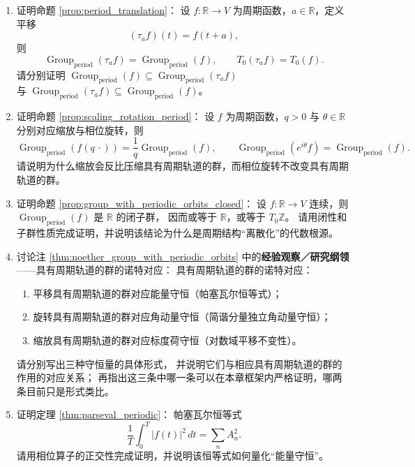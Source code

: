 \begin{enumerate}[leftmargin=3em, label=\textbf{题 \arabic*}]
    \item 证明命题 \ref{prop:period_translation}：
    设 $f:\mathbb{R}\to V$ 为周期函数，$a\in\mathbb{R}$，定义平移
    \[
    (\tau_af)(t)=f(t+a),
    \]
    则
    \[
    \operatorname{Group}_{\mathrm{period}}(\tau_af)=\operatorname{Group}_{\mathrm{period}}(f),\qquad
    T_0(\tau_af)=T_0(f).
    \]
    请分别证明 $\operatorname{Group}_{\mathrm{period}}(f)\subseteq\operatorname{Group}_{\mathrm{period}}(\tau_af)$\\
    与 $\operatorname{Group}_{\mathrm{period}}(\tau_af)\subseteq\operatorname{Group}_{\mathrm{period}}(f)$。

    \item 证明命题 \ref{prop:scaling_rotation_period}：
    设 $f$ 为周期函数，$q>0$ 与 $\theta\in\mathbb{R}$ 分别对应缩放与相位旋转，则
    \[
    \operatorname{Group}_{\mathrm{period}}(f(q\,\cdot))=\frac{1}{q}\operatorname{Group}_{\mathrm{period}}(f),\qquad
    \operatorname{Group}_{\mathrm{period}}(e^{i\theta}f)=\operatorname{Group}_{\mathrm{period}}(f).
    \]
    请说明为什么缩放会反比压缩具有周期轨道的群，而相位旋转不改变具有周期轨道的群。

    \item 证明命题 \ref{prop:group_with_periodic_orbits_closed}：
    设 $f:\mathbb{R}\to V$ 连续，则 $\operatorname{Group}_{\mathrm{period}}(f)$ 是 $\mathbb{R}$ 的闭子群，
    因而或等于 $\mathbb{R}$，或等于 $T_0\mathbb{Z}$。
    请用闭性和子群性质完成证明，并说明该结论为什么是周期结构“离散化”的代数根源。

    \item 讨论注 \ref{thm:noether_group_with_periodic_orbits} 中的\textbf{经验观察／研究纲领}——具有周期轨道的群的诺特对应：
    具有周期轨道的群的诺特对应：
    \begin{enumerate}[label=(\roman*)]
        \item 平移具有周期轨道的群对应能量守恒（帕塞瓦尔恒等式）；
        \item 旋转具有周期轨道的群对应角动量守恒（简谐分量独立角动量守恒）；
        \item 缩放具有周期轨道的群对应标度荷守恒（对数域平移不变性）。
    \end{enumerate}
    请分别写出三种守恒量的具体形式，
    并说明它们与相应具有周期轨道的群的作用的对应关系；
    再指出这三条中哪一条可以在本章框架内严格证明，哪两条目前只是形式类比。

    \item 证明定理 \ref{thm:parseval_periodic}：
    帕塞瓦尔恒等式
    \[
    \frac{1}{T}\int_0^T|f(t)|^2\,dt=\sum_nA_n^2.
    \]
    请用相位算子的正交性完成证明，并说明该恒等式如何量化“能量守恒”。


\end{enumerate}
